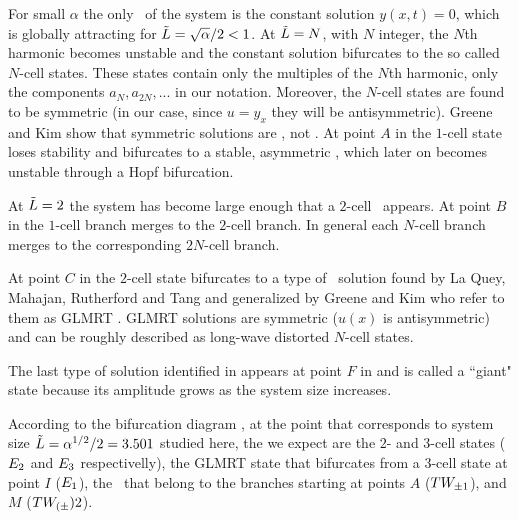 For small $\alpha$ the only \eqv\ of the system is the constant solution $y(x,t)=0$,
which is globally attracting 
for $\tilde{L}=\sqrt{\alpha}/2<1$. At $\tilde{L}=N$, with $N$ integer, 
the $N$th harmonic becomes unstable and the constant solution
bifurcates to the so called $N$-cell states. 
These states contain only the multiples of the $N$th
harmonic, {\ie} only the components $a_N,a_{2N},...$ in our notation. 
Moreover, the $N$-cell states are found to be symmetric (in our case, since $u=y_x$ they will be
antisymmetric). 
Greene and Kim show that symmetric solutions are \eqva, not \reqva. 
At point $A$ in  the $1$-cell state loses stability
and bifurcates to a stable, 
asymmetric \reqv, which later on becomes unstable through a Hopf bifurcation. 

At $\tilde{L}=2$ the system has become large enough that a $2$-cell \eqv\ appears. At point $B$
in  the $1$-cell branch merges to the $2$-cell branch. In general each $N$-cell branch merges to the corresponding $2N$-cell branch.

At point $C$ in  the $2$-cell state bifurcates to a type of 
\eqv\ solution
found by La Quey, Mahajan, Rutherford and Tang and generalized by Greene and Kim who refer to them as GLMRT \eqva. GLMRT solutions are symmetric 
($u(x)$ is antisymmetric)
and can be roughly described as long-wave distorted $N$-cell states.

The last type of solution identified in  appears at point $F$ 
in  and is called a
``giant" state because its amplitude grows as the system size increases.

According to the bifurcation diagram , 
at the point that corresponds to system size $\tilde{L}=\alpha^{1/2}/2=3.501$
studied here,
the {\eqva} we expect are the $2$- and $3$-cell states ($E_{2}$ and $E_{3}$ respectivelly), the GLMRT state that bifurcates from a $3$-cell state at point $I$ ($E_{1}$),
the \reqva\ that belong to the branches starting at points $A$ ($TW_{\pm1}$),
and $M$ ($TW_{(\pm}){2}$).

